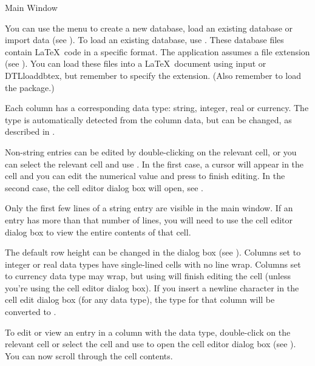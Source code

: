  {%
 }
 {Main Window}

 You can use the  menu to create a new 
database, load an existing database or import data (see 
). To load an existing database, use
. These database files contain \LaTeX\ code
in a specific format. The  application assumes 
a  file extension (see ).
You can load these files into a \LaTeX\ document using 
\gls{input} or \gls{DTLloaddbtex}, but remember to specify 
the  extension. (Also remember to load the 
 package.)

Each column has a corresponding data type: string, integer, real
or currency. The type is automatically detected from the column data,
but can be changed, as described in .

Non-string entries can be edited by double-clicking on the relevant cell, 
or you can select the relevant cell and use .
In the first case, a cursor will appear in the cell and you 
can edit the numerical value and press  to finish 
editing. In the second case, the cell editor dialog box will 
open, see .

\begin{information}
Only the first few lines of a string entry are visible in the main 
window. If an entry has more than that number of lines, you will need to 
use the cell editor dialog box to view the entire contents of that 
cell.
\end{information}

The default row height can be changed in the
 dialog box (see ).
Columns set to integer or real data types have single-lined cells with no
line wrap. Columns set to currency data type may wrap, but using 
 will finish editing the cell (unless you're using the cell
editor dialog box). If you insert a newline character in the cell
edit dialog box (for any data type), the type for that column will 
be converted to .

To edit or view an entry in a column
with the  data type, double-click on the relevant cell or 
select the cell and use  to open the cell editor 
dialog box (see ). You can now scroll through
the cell contents.

